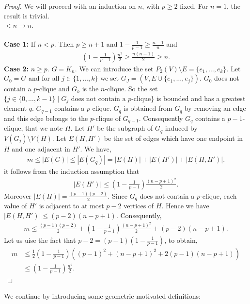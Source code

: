 \documentclass[12pt,a4paper]{article}
\theoremstyle{definition}
\begin{document}
\begin{proof}
We will proceed with an induction on $n$, with $p \geq 2$ fixed. For $n=1$, the result is trivial. \\
$<n \to n$. \\
\\
\textbf{Case 1:} If $n<p$. Then $p \geq n+1$ and $1- \frac{1}{p-1} \geq \frac{n-1}{n}$ and 
\begin{align*}
\left( 1- \frac{1}{p-1} \right) \frac{n^2}{2} \geq \frac{n(n-1)}{2} \geq n.
\end{align*}
\textbf{Case 2:} $n \geq p$. $G=K_n$. We can introduce the set $P_2(V) \setminus E = \{e_1, \dots , e_k\}.$ Let $G_0=G$ and for all $j \in \{1, \dots , k\}$ we set $G_J= (V, E \cup \{e_1, \dots ,  e_j\}).$ $G_0$ does not contain a $p$-clique and $G_k$ is the $n$-clique. So the set $\{ j \in \{0, \dots ,  k-1\} \mid G_j \text{ does not contain a $p$-clique}\}$ is bounded and has a greatest element $q$. $G_{q-1}$ contains a $p$-clique. $G_q$ is obtained from $G_q$ by removing an edge and this edge belongs to the $p$-clique of $G_{q-1}.$ Consequently $G_q$ contains a $p-1$-clique, that we note $H$. Let $H'$ be the subgraph of $G_q$ induced by $V(G_j) \setminus V(H)$. Let $E(H,H')$ be the set of edges which have one endpoint in $H$ and one adjacent in $H'$. We have,
\begin{align*}
m \leq |E(G)| \leq |E(G_q)| = |E(H)| + |E(H')| + |E(H, H')|.
\end{align*}
it follows from the induction assumption that 
\begin{align*}
|E(H')| \leq \left( 1- \frac{1}{p-1}\right) \frac{(n-p+1)^2}{2}.
\end{align*}
Moreover $|E(H)| = \frac{(p-1)(p-2)}{2}$. Since $G_q$ does not contain a $p$-clique, each value of $H'$ is adjacent to at most $p-2$ vertices of $H$. Hence we have $|E(H,H')| \leq (p-2)(n-p+1)$. Consequently,
\begin{align*}
m \leq \frac{(p-1)(p-2)}{2} + \left( 1 - \frac{1}{p-1} \right) \frac{(n-p+1)^2}{2}+ (p-2)(n-p+1).
\end{align*}
Let us uise the fact that $p-2= (p-1) \left( 1 - \frac{1}{p-1}\right)$, to obtain, 
\begin{align*}
m &\leq \frac{1}{2} \left( 1- \frac{1}{p-1}\right) \left( (p-1)^2 + (n-p+1)^2 +2(p-1)(n-p+1)\right)\\
& \leq \left( 1 - \frac{1}{p-1} \right) \frac{n^2}{2}.
\end{align*}
\end{proof}
\newpage
We continue by introducing some geometric motivated definitions:
\end{document}
